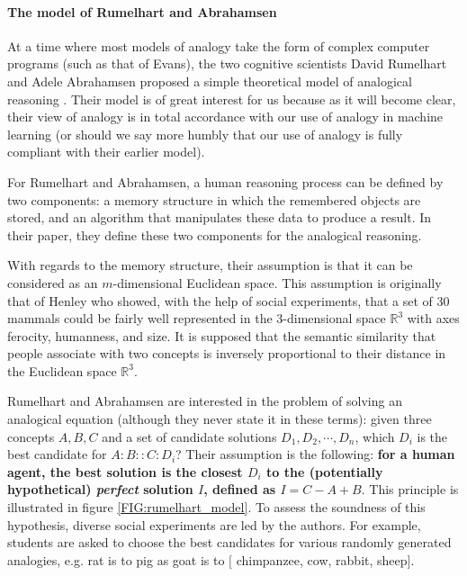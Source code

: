 \paragraph{The model of Rumelhart and Abrahamsen\\}
\label{SEC:rumelhart_Abrahamsen}

At a time where most models of analogy take the form of complex computer
programs (such as that of Evans), the two cognitive scientists David Rumelhart
and Adele Abrahamsen proposed a simple theoretical model of analogical
reasoning \cite{RumAbr73}. Their model is of great interest for us because as
it will become clear, their view of analogy is in total accordance with our use
of analogy in machine learning (or should we say more humbly that our use of
analogy is fully compliant with their earlier model).

For Rumelhart and Abrahamsen, a human reasoning process can be defined by two
components: a memory structure in which the remembered objects are stored, and
an algorithm that manipulates these data to produce a result. In their paper,
they define these two components for the analogical reasoning.

With regards to the memory structure, their assumption is that it can be
considered as an $m$-dimensional Euclidean space. This assumption is originally
that of Henley \cite{Hen69} who showed, with the help of social experiments,
that a set of 30 mammals could be fairly well represented in the 3-dimensional
space $\mathbb{R}^3$ with axes ferocity, humanness, and size. It is supposed
that the semantic similarity that people associate with two concepts is
inversely proportional to their distance in the Euclidean space $\mathbb{R}^3$.

Rumelhart and Abrahamsen are interested in the problem of solving an analogical
equation (although they never state it in these terms): given three concepts
$A, B, C$ and a set of candidate solutions $D_1, D_2, \cdots, D_n$, which $D_i$
is the best candidate for $A:B::C:D_i$? Their assumption is the following:
\textbf{ for a human agent, the best solution is the closest $D_i$ to the
(potentially hypothetical) \textit{perfect} solution $I$, defined as $I = C - A
+ B$}. This principle is illustrated in figure \ref{FIG:rumelhart_model}.
To assess the soundness of this hypothesis, diverse social experiments are led
by the authors. For example, students are asked to choose the best candidates
for various randomly generated analogies, e.g. rat is to pig as goat is to $[$
chimpanzee, cow, rabbit, sheep$]$.

